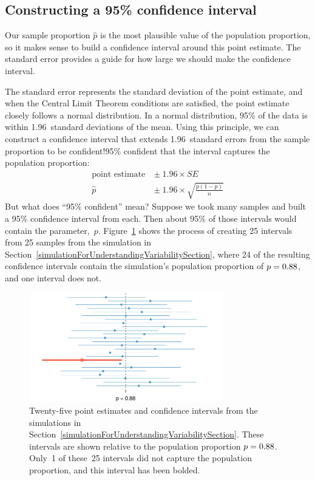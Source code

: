 \subsection{Constructing a 95\% confidence interval}

Our sample proportion $\hat{p}$ is the most plausible
value of the population proportion, so it makes sense
to build a confidence interval around this point estimate.
The standard error
provides a guide for how
large we should make the confidence interval.

The standard error represents the standard deviation
of the point estimate, and when the Central
Limit Theorem conditions are satisfied,
the point estimate closely follows a normal distribution.
In a normal distribution, 95\% of
the data is within 1.96~standard deviations of the mean.
Using this principle, we can construct a confidence
interval that extends 1.96~standard errors from the sample
proportion to be 
    {confident!95\% confident}
that the interval captures the population proportion:
\begin{align*}
\text{point estimate}\ &\pm\ 1.96 \times SE \\
\hat{p}\ &\pm\ 1.96 \times \sqrt{\frac{p (1 - p)}{n}}
\end{align*}
But what does ``95\% confident'' mean? Suppose we took
many samples and built a 95\% confidence interval from
each. Then about 95\% of those intervals would
contain the parameter,~$p$.
Figure~\ref{95PercentConfidenceInterval} shows the
process of creating 25 intervals from 25 samples
from the simulation in
Section~\ref{simulationForUnderstandingVariabilitySection},
where 24 of the resulting confidence intervals contain
the simulation's population proportion of
$p = 0.88{}$, and one interval does not.

\D{\newpage}

\begin{figure}
   \centering
   \includegraphics[width=0.75\textwidth]{ch_foundations_for_inf/figures/95PercentConfidenceInterval/95PercentConfidenceInterval}
   \caption{Twenty-five point estimates and confidence
       intervals from the simulations in
       Section~\ref{simulationForUnderstandingVariabilitySection}.
       These intervals are shown relative to the population
       proportion $p = 0.88{}$.
       Only~1 of these~25
       intervals did not capture the population
       proportion, and this interval has been bolded.}
   \label{95PercentConfidenceInterval}
\end{figure}

